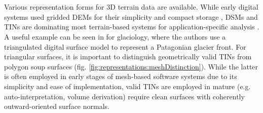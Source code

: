 \documentclass[review]{elsarticle}
\begin{document}




\section{}
\label{sec:representations}

Various representation forms for 3D terrain data are available. While early digital systems used gridded \glspl{DEM} for their simplicity and compact storage \cite{Trinks2005,McCaffrey2005}, \glspl{DSM} and \glspl{TIN} are dominating most terrain-based systems for application-specific analysis \cite{Buckley2008a,Caumon2013} . A useful example can be seen in \cite{Schwalbe2017b} for glaciology, where the authors use a  triangulated digital surface model to represent a Patagonian glacier front.
For triangular surfaces, it is important to distinguish geometrically valid \glspl{TIN} from polygon soup surfaces (fig. \ref{fig:representations:meshDistinction}). While the latter is often employed in early stages of mesh-based software systems due to its simplicity and ease of implementation, valid \glspl{TIN} are employed in mature  (e.g. auto-interpretation, volume derivation) require clean surfaces with coherently outward-oriented surface normals.
\end{document}
